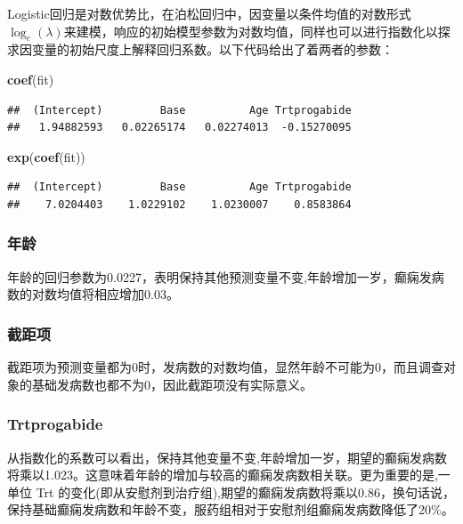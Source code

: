 \documentclass[
]{article}
\newenvironment{Shaded}{\begin{snugshade}}{\end{snugshade}}
\newcommand{\KeywordTok}[1]{\textcolor[rgb]{0.13,0.29,0.53}{\textbf{#1}}}
\newcommand{\NormalTok}[1]{#1}
\begin{document}
Logistic回归是对数优势比，在泊松回归中，因变量以条件均值的对数形式\(\log _{e}(\lambda)\)来建模，响应的初始模型参数为对数均值，同样也可以进行指数化以探求因变量的初始尺度上解释回归系数。以下代码给出了着两者的参数：

\begin{Shaded}
\begin{Highlighting}[]
\KeywordTok{coef}\NormalTok{(fit)}
\end{Highlighting}
\end{Shaded}

\begin{verbatim}
##  (Intercept)         Base          Age Trtprogabide 
##   1.94882593   0.02265174   0.02274013  -0.15270095
\end{verbatim}

\begin{Shaded}
\begin{Highlighting}[]
\KeywordTok{exp}\NormalTok{(}\KeywordTok{coef}\NormalTok{(fit))}
\end{Highlighting}
\end{Shaded}

\begin{verbatim}
##  (Intercept)         Base          Age Trtprogabide 
##    7.0204403    1.0229102    1.0230007    0.8583864
\end{verbatim}

\hypertarget{ux5e74ux9f84}{%
\subsubsection{年龄}\label{ux5e74ux9f84}}

年龄的回归参数为0.0227，表明保持其他预测变量不变,年龄增加一岁，癫痫发病数的对数均值将相应增加0.03。

\hypertarget{ux622aux8dddux9879}{%
\subsubsection{截距项}\label{ux622aux8dddux9879}}

截距项为预测变量都为0时，发病数的对数均值，显然年龄不可能为0，而且调查对象的基础发病数也都不为0，因此截距项没有实际意义。

\hypertarget{trtprogabide}{%
\subsubsection{Trtprogabide}\label{trtprogabide}}

从指数化的系数可以看出，保持其他变量不变,年龄增加一岁，期望的癫痫发病数将乘以1.023。这意味着年龄的增加与较高的癫痫发病数相关联。更为重要的是,一单位
Trt
的变化(即从安慰剂到治疗组),期望的癫痫发病数将乘以0.86，换句话说，保持基础癫痫发病数和年龄不变，服药组相对于安慰剂组癫痫发病数降低了20\%。
\end{document}
